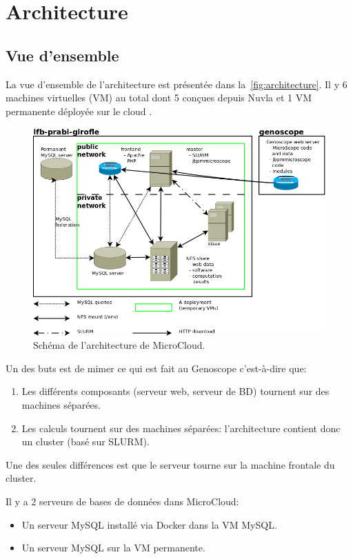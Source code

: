 \chapter{Architecture}

\section{Vue d'ensemble}

La vue d'ensemble de l'architecture est présentée dans la~\autoref{fig:architecture}.
Il y 6 machines virtuelles (VM) au total dont 5 conçues depuis Nuvla et
1 VM permanente déployée sur le cloud .

\begin{figure}[htp]
	\centering
	\includegraphics[width=\linewidth]{../Logical_Architecture}
	\caption{Schéma de l'architecture de MicroCloud.}
	\label{fig:architecture}
\end{figure}

Un des buts est de mimer ce qui est fait au Genoscope
c'est-à-dire que:
\begin{enumerate}
	\item Les différents composants (serveur web, serveur de BD) tournent sur des machines séparées.
	\item Les calculs tournent sur des machines séparées: l'architecture contient donc un cluster (basé sur SLURM).
\end{enumerate}
Une des seules différences est que le serveur  tourne
sur la machine frontale du cluster.

Il y a 2 serveurs de bases de données dans MicroCloud:
\begin{itemize}
	\item Un serveur MySQL installé via Docker dans la VM MySQL.
	\item Un serveur MySQL sur la VM permanente.
\end{itemize}

